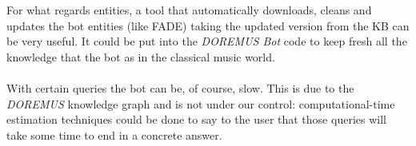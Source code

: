 	For what regards entities, a tool that automatically downloads, cleans and updates the bot entities (like FADE\cite{fade}) taking the updated version from the KB can be very useful. It could be put into the \textit{DOREMUS Bot} code to keep fresh all the knowledge that the bot as in the classical music world.\\\\
	With certain queries the bot can be, of course, slow. This is due to the \textit{DOREMUS} knowledge graph and is not under our control: computational-time estimation techniques could be done to say to the user that those queries will take some time to end in a concrete answer.
	